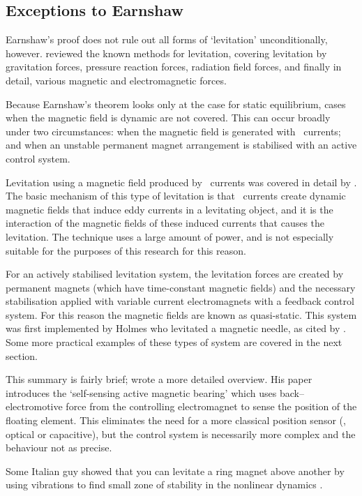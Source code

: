 \subsection{Exceptions to Earnshaw}

Earnshaw's proof does not rule out all forms of `levitation' unconditionally,
however. \textcite{boerdijk1956a} reviewed the known methods for levitation,
covering levitation by gravitation forces, pressure reaction forces, radiation
field forces, and finally in detail, various magnetic and electromagnetic
forces.

Because Earnshaw's theorem looks only at the case for static equilibrium,
cases when the magnetic field is dynamic are not covered. This can occur
broadly under two circumstances: when the magnetic field is generated with
\AC\ currents; and when an unstable permanent magnet arrangement is stabilised
with an active control system.

Levitation using a magnetic field produced by \AC\ currents was covered in
detail by \textcite{laithwaite1965}. The basic mechanism of this type of
levitation is that \AC\ currents create dynamic magnetic fields that induce
eddy currents in a levitating object, and it is the interaction of the
magnetic fields of these induced currents that causes the levitation. The
technique uses a large amount of power, and is not especially suitable for the
purposes of this research for this reason.

For an actively stabilised levitation system, the levitation forces are
created by permanent magnets (which have time-constant magnetic fields) and
the necessary stabilisation applied with variable current electromagnets with
a feedback control system. For this reason the magnetic fields are known as
quasi-static. This system was first implemented by Holmes who levitated a
magnetic needle, as cited by \textcite{boerdijk1956a}. Some more practical
examples of these types of system are covered in the next section.

This summary is fairly brief; \textcite{bleuler1992} wrote a more detailed
overview. His paper introduces the `self-sensing active magnetic bearing'
\cite{vischer1993} which uses back--electromotive force from the controlling
electromagnet to sense the position of the floating element. This eliminates
the need for a more classical position sensor (\eg, optical or capacitive),
but the control system is necessarily more complex and the behaviour not as
precise.

Some Italian guy showed that you can levitate a ring magnet above another by
using vibrations to find small zone of stability in the nonlinear dynamics
\cite{bassani2007}.

